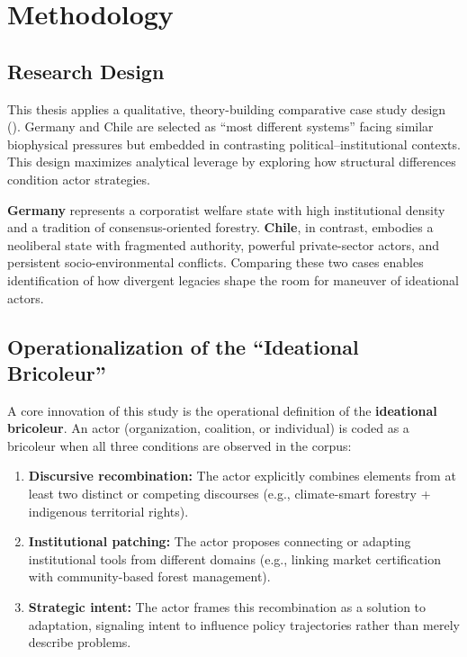 \section*{Methodology}

\subsection*{Research Design}
This thesis applies a qualitative, theory-building comparative case study 
design (\cite{George2005}). Germany and Chile are selected as ``most different systems'' 
facing similar biophysical pressures but embedded in contrasting political–institutional 
contexts. This design maximizes analytical leverage by exploring how structural 
differences condition actor strategies. 

\textbf{Germany} represents a corporatist welfare state with high institutional density 
and a tradition of consensus-oriented forestry. \textbf{Chile}, in contrast, embodies a 
neoliberal state with fragmented authority, powerful private-sector actors, and persistent 
socio-environmental conflicts. Comparing these two cases enables identification of how 
divergent legacies shape the room for maneuver of ideational actors.

\subsection*{Operationalization of the ``Ideational Bricoleur''}
A core innovation of this study is the operational definition of the 
\textbf{ideational bricoleur}. An actor (organization, coalition, or individual) 
is coded as a bricoleur when all three conditions are observed in the corpus:

\begin{enumerate}
    \item \textbf{Discursive recombination:} The actor explicitly combines elements from 
    at least two distinct or competing discourses (e.g., climate-smart forestry + 
    indigenous territorial rights).
    \item \textbf{Institutional patching:} The actor proposes connecting or adapting 
    institutional tools from different domains (e.g., linking market certification 
    with community-based forest management).
    \item \textbf{Strategic intent:} The actor frames this recombination as a solution 
    to adaptation, signaling intent to influence policy trajectories rather than merely 
    describe problems.
\end{enumerate}

